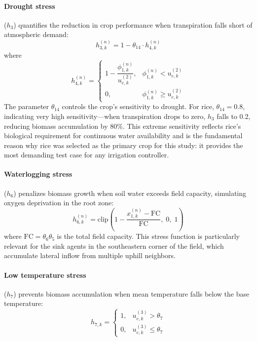 \paragraph{Drought stress} ($h_3$) quantifies the reduction in crop performance when transpiration falls short of atmospheric demand:
\begin{equation}
    h_{3,k}^{(n)} = 1 - \theta_{14} \cdot h_{4,k}^{(n)}
    \label{eq:h3}
\end{equation}
where
\begin{equation}
    h_{4,k}^{(n)} = 
    \begin{cases}
        1 - \dfrac{\phi_{1,k}^{(n)}}{u_{e,k}^{(2)}}, & \phi_{1,k}^{(n)} < u_{e,k}^{(2)} \\[8pt]
        0, & \phi_{1,k}^{(n)} \geq u_{e,k}^{(2)}
    \end{cases}
    \label{eq:h4}
\end{equation}
The parameter $\theta_{14}$ controls the crop's sensitivity to drought. For rice, $\theta_{14} = 0.8$, indicating very high sensitivity---when transpiration drops to zero, $h_3$ falls to 0.2, reducing biomass accumulation by 80\%. This extreme sensitivity reflects rice's biological requirement for continuous water availability and is the fundamental reason why rice was selected as the primary crop for this study: it provides the most demanding test case for any irrigation controller.

\paragraph{Waterlogging stress} ($h_6$) penalizes biomass growth when soil water exceeds field capacity, simulating oxygen deprivation in the root zone:
\begin{equation}
    h_{6,k}^{(n)} = \text{clip}\!\left(1 - \frac{x_{1,k}^{(n)} - \text{FC}}{\text{FC}},\; 0,\; 1\right)
    \label{eq:h6}
\end{equation}
where $\text{FC} = \theta_6 \theta_5$ is the total field capacity. This stress function is particularly relevant for the sink agents in the southeastern corner of the field, which accumulate lateral inflow from multiple uphill neighbors.

\paragraph{Low temperature stress} ($h_7$) prevents biomass accumulation when mean temperature falls below the base temperature:
\begin{equation}
    h_{7,k} = 
    \begin{cases}
        1, & u_{e,k}^{(3)} > \theta_7 \\
        0, & u_{e,k}^{(3)} \leq \theta_7
    \end{cases}
    \label{eq:h7}
\end{equation}

